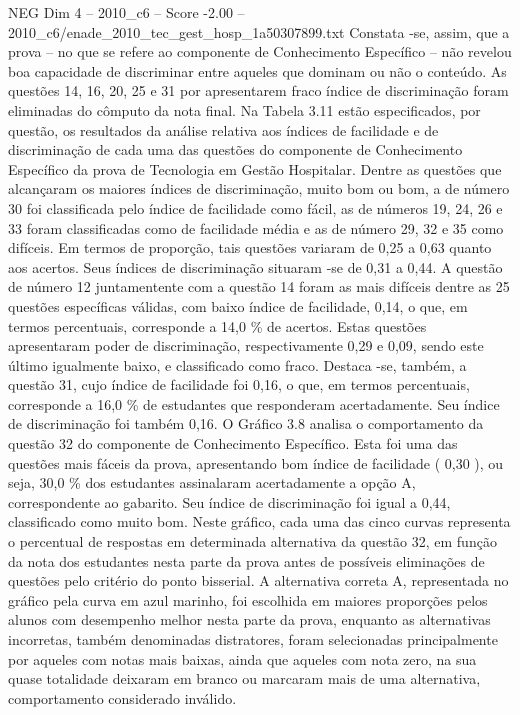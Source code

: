 \begin{textsample}{NEG Dim 4 – 2010\_c6 – Score -2.00 – 2010\_c6/enade\_2010\_tec\_gest\_hosp\_1a50307899.txt}
Constata -se, assim, que a prova – no que se refere ao componente de Conhecimento Específico – não revelou boa capacidade de discriminar entre aqueles que dominam ou não o conteúdo.
As questões 14, 16, 20, 25 e 31 por apresentarem fraco índice de discriminação foram eliminadas do cômputo da nota final.
Na Tabela 3.11 estão especificados, por questão, os resultados da análise relativa aos índices de facilidade e de discriminação de cada uma das questões do componente de Conhecimento Específico da prova de Tecnologia em Gestão Hospitalar.
Dentre as questões que alcançaram os maiores índices de discriminação, muito bom ou bom, a de número 30 foi classificada pelo índice de facilidade como fácil, as de números 19, 24, 26 e 33 foram classificadas como de facilidade média e as de número 29, 32 e 35 como difíceis.
Em termos de proporção, tais questões variaram de 0,25 a 0,63 quanto aos acertos.
Seus índices de discriminação situaram -se de 0,31 a 0,44.
A questão de número 12 juntamentente com a questão 14 foram as mais difíceis dentre as 25 questões específicas válidas, com baixo índice de facilidade, 0,14, o que, em termos percentuais, corresponde a 14,0 \% de acertos.
Estas questões apresentaram poder de discriminação, respectivamente 0,29 e 0,09, sendo este último igualmente baixo, e classificado como fraco.
Destaca -se, também, a questão 31, cujo índice de facilidade foi 0,16, o que, em termos percentuais, corresponde a 16,0 \% de estudantes que responderam acertadamente.
Seu índice de discriminação foi também 0,16.
O Gráfico 3.8 analisa o comportamento da questão 32 do componente de Conhecimento Específico.
Esta foi uma das questões mais fáceis da prova, apresentando bom índice de facilidade ( 0,30 ), ou seja, 30,0 \% dos estudantes assinalaram acertadamente a opção A, correspondente ao gabarito.
Seu índice de discriminação foi igual a 0,44, classificado como muito bom.
Neste gráfico, cada uma das cinco curvas representa o percentual de respostas em determinada alternativa da questão 32, em função da nota dos estudantes nesta parte da prova antes de possíveis eliminações de questões pelo critério do ponto bisserial.
A alternativa correta A, representada no gráfico pela curva em azul marinho, foi escolhida em maiores proporções pelos alunos com desempenho melhor nesta parte da prova, enquanto as alternativas incorretas, também denominadas distratores, foram selecionadas principalmente por aqueles com notas mais baixas, ainda que aqueles com nota zero, na sua quase totalidade deixaram em branco ou marcaram mais de uma alternativa, comportamento considerado inválido.

\end{textsample}
